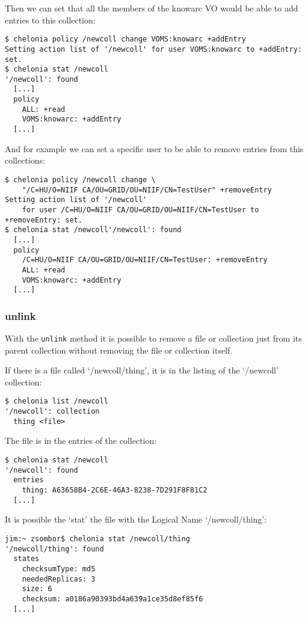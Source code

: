Then we can set that all the members of the knowarc VO would be able to add entries to this collection:
\begin{verbatim}
$ chelonia policy /newcoll change VOMS:knowarc +addEntry
Setting action list of '/newcoll' for user VOMS:knowarc to +addEntry: set.
$ chelonia stat /newcoll
'/newcoll': found
  [...]
  policy
    ALL: +read
    VOMS:knowarc: +addEntry
  [...]
\end{verbatim}

And for example we can set a specific user to be able to remove entries from this collections:
\begin{verbatim}
$ chelonia policy /newcoll change \
    "/C=HU/O=NIIF CA/OU=GRID/OU=NIIF/CN=TestUser" +removeEntry
Setting action list of '/newcoll'
    for user /C=HU/O=NIIF CA/OU=GRID/OU=NIIF/CN=TestUser to +removeEntry: set.
$ chelonia stat /newcoll'/newcoll': found
  [...]
  policy
    /C=HU/O=NIIF CA/OU=GRID/OU=NIIF/CN=TestUser: +removeEntry
    ALL: +read
    VOMS:knowarc: +addEntry
  [...]
\end{verbatim}


\subsubsection{unlink} %
\label{ssub:unlink}

With the \texttt{unlink} method it is possible to remove a file or collection just from its parent collection without removing the file or collection itself.
\hspace*{0.5cm}
\begin{shaded}
\end{shaded}

If there is a file called `/newcoll/thing', it is in the listing of the `/newcoll' collection:
\begin{verbatim}
$ chelonia list /newcoll
'/newcoll': collection
  thing <file>
\end{verbatim}    
The file is in the entries of the collection:
\begin{verbatim}
$ chelonia stat /newcoll
'/newcoll': found
  entries
    thing: A63658B4-2C6E-46A3-8238-7D291F8F81C2
  [...]
\end{verbatim}

It is possible the `stat' the file with the Logical Name `/newcoll/thing':
\begin{verbatim}
jim:~ zsombor$ chelonia stat /newcoll/thing
'/newcoll/thing': found
  states
    checksumType: md5
    neededReplicas: 3
    size: 6
    checksum: a0186a90393bd4a639a1ce35d8ef85f6
  [...]
\end{verbatim}


